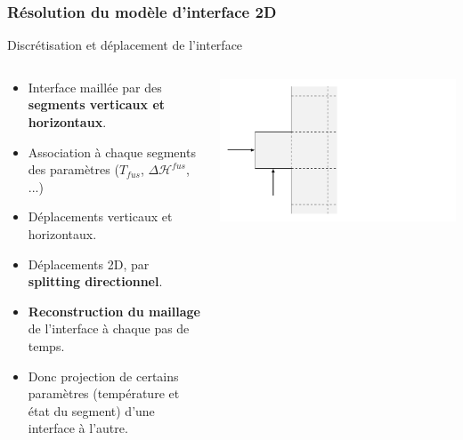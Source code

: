 \documentclass{beamer}
\begin{document}
\begin{frame}
    \frametitle{Résolution du modèle d'interface 2D}
    \footnotesize
	\begin{ceablock}{Discrétisation et déplacement de l'interface}
	\begin{columns}[c]
	\begin{column}{0.7\textwidth}
	\begin{itemize}
		\item Interface maillée par des \textbf{segments verticaux et horizontaux}.\\
        \item Association à chaque segments des paramètres ($T_{fus}$, $\Delta \mathcal{H}^{fus}$, ...)\\
        \item Déplacements verticaux et horizontaux.\\
        \item Déplacements 2D, par \textbf{splitting directionnel}.\\
        \item \textbf{Reconstruction du maillage} de l'interface à chaque pas de temps.\\
        \item Donc projection de certains paramètres (température et état du segment) d'une interface à l'autre.
	\end{itemize}
	
	\end{column}
	\begin{column}{0.3\textwidth}
	\begin{center}
		\includegraphics[width=1.55\textwidth]{Figures/interface.pdf}
	\end{center}

	\end{column}

	\end{columns}
	\center {}
		\end{ceablock}
	\end{frame}
	
\end{document}
